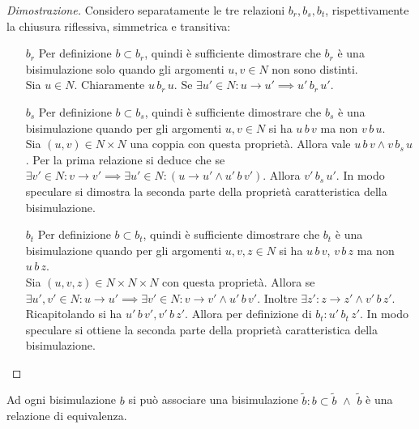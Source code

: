 \begin{proof}[Dimostrazione] Considero separatamente le tre relazioni $b_r, b_s, b_t$, rispettivamente la chiusura riflessiva, simmetrica e transitiva:
    \begin{itemize}
        \item[$b_r$] Per definizione $b \subset b_r$, quindi è sufficiente dimostrare che $b_r$ è una bisimulazione solo quando gli argomenti $u,v \in N$ non sono distinti.\\
        Sia $u \in N$. Chiaramente $u \,b_r\, u$. Se $\exists u' \in N : u \to u' \implies u' \,b_r\, u'$.
        \item[$b_s$] Per definizione $b \subset b_s$, quindi è sufficiente dimostrare che $b_s$ è una bisimulazione quando per gli argomenti $u,v \in N$ si ha $u \,b\, v$ ma non $v \,b\, u$.\\
        Sia $(u,v) \in N \times N$ una coppia con questa proprietà. Allora vale $u \,b\, v \land v \,b_s\, u$. Per la prima relazione si deduce che se $\exists v' \in N : v \to v' \implies \exists u' \in N : (u \to u' \land u' \,b\,v')$. Allora $v' \,b_s\, u'$. In modo speculare si dimostra la seconda parte della proprietà caratteristica della bisimulazione.
        \item[$b_t$] Per definizione $b \subset b_t$, quindi è sufficiente dimostrare che $b_t$ è una bisimulazione quando per gli argomenti $u,v,z \in N$ si ha $u \,b\, v$, $v \,b\, z$ ma non $u \,b\, z$.\\
        Sia $(u,v,z) \in N \times N \times N$ con questa proprietà. Allora se $\exists u', v' \in N : u \to u' \implies \exists v' \in N : v \to v' \land u' \,b\, v'$. Inoltre $\exists z' : z \to z' \land v' \,b\, z'$.\\
        Ricapitolando si ha $u' \,b\, v', v' \,b\, z'$. Allora per definizione di $b_t: u' \,b_t\, z'$. In modo speculare si ottiene la seconda parte della proprietà caratteristica della bisimulazione.
    \end{itemize}
\end{proof}
\begin{corollary}
    Ad ogni bisimulazione $b$ si può associare una bisimulazione $\widetilde{b} : b \subset \widetilde{b} \,\,\land\,\, \widetilde{b}$ è una relazione di equivalenza.
\end{corollary}
